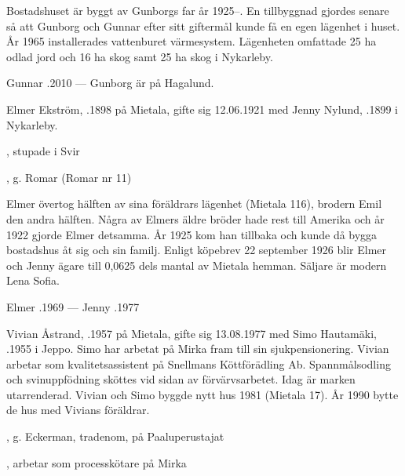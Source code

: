 Bostadshuset är byggt av Gunborgs far år 1925--. En tillbyggnad gjordes senare så att Gunborg och Gunnar efter sitt
giftermål kunde få en egen lägenhet i huset. År 1965 installerades vattenburet värmesystem. Lägenheten omfattade 25 ha odlad jord och 16 ha skog samt 25 ha skog i Nykarleby.

Gunnar .2010  ---  Gunborg är på Hagalund.


Elmer Ekström, .1898 på Mietala, gifte sig 12.06.1921 med Jenny Nylund, .1899 i Nykarleby.
\begin{jhchildren}
  \item {}, stupade i Svir
  \item {}
  \item {}, g. Romar (Romar nr 11)
\end{jhchildren}

Elmer övertog hälften av sina föräldrars lägenhet (Mietala 116), brodern Emil den andra hälften. Några av Elmers äldre bröder hade rest till  Amerika och år 1922 gjorde Elmer detsamma. År 1925 kom han tillbaka och kunde då bygga bostadshus åt sig och sin familj. Enligt köpebrev 22 september 1926 blir Elmer och Jenny ägare till 0,0625 dels mantal av Mietala hemman. Säljare är modern Lena Sofia.

Elmer .1969  ---  Jenny .1977






Vivian Åstrand, .1957 på Mietala, gifte sig 13.08.1977 med Simo Hautamäki, .1955 i Jeppo. Simo har arbetat på Mirka fram till sin sjukpensionering. Vivian arbetar som kvalitetsassistent på Snellmans Köttförädling Ab. Spannmålsodling och  svinuppfödning sköttes vid sidan av förvärvsarbetet. Idag är marken utarrenderad. Vivian och Simo byggde nytt hus 1981 (Mietala 17). År 1990 bytte de hus med Vivians föräldrar.
\begin{jhchildren}
  \item {}, g. Eckerman, tradenom, på Paaluperustajat
  \item {}, arbetar som processkötare på Mirka
\end{jhchildren}


